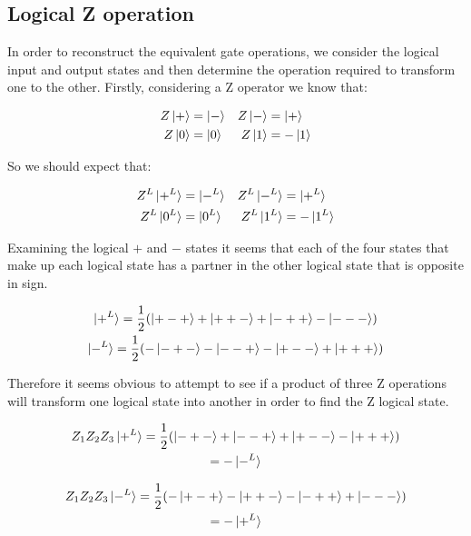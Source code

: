 
\subsection{Logical Z operation}

In order to reconstruct the equivalent gate operations, we consider the logical input and output states and then determine the operation required to transform one to the other. Firstly, considering a Z operator we know that:

\begin{align*}
Z \ket{+} &= \ket{-} & Z \ket{-} &= \ket{+} \\
Z \ket{0} &= \ket{0} & Z \ket{1} &= -\ket{1} \\
\end{align*}

So we should expect that:

\begin{align*}
Z^{L} \ket{+^{L}} &= \ket{-^{L}} & Z^{L} \ket{-^{L}} &= \ket{+^{L}} \\
Z^{L} \ket{0^{L}} &= \ket{0^{L}} & Z^{L} \ket{1^{L}} &= -\ket{1^{L}} \\
\end{align*}

Examining the logical $+$ and $-$ states it seems that each of the four states that make up each logical state has a partner in the other logical state that is opposite in sign. 

\begin{multline*}
\ket{+^{L}} = \frac{1}{2}(\ket{+-+} + \ket{++-} + \ket{-++} - \ket{---}) \\
\ket{-^{L}} = \frac{1}{2}(- \ket{-+-} - \ket{--+} - \ket{+--} + \ket{+++}) \\
\end{multline*}

Therefore it seems obvious to attempt to see if a product of three Z operations will transform one logical state into another in order to find the Z logical state.

\begin{multline}
\label{eq:3z_l_plus}
Z_{1}Z_{2}Z_{3} \ket{+^{L}} = \frac{1}{2}(\ket{-+-} + \ket{--+} + \ket{+--} - \ket{+++}) \\
= - \ket{-^{L}} \\
\end{multline}

\begin{multline}
\label{eq:3z_l_minus}
Z_{1}Z_{2}Z_{3} \ket{-^{L}} = \frac{1}{2}(- \ket{+-+} - \ket{++-} - \ket{-++} + \ket{---}) \\ 
= - \ket{+^{L}} \\
\end{multline}

